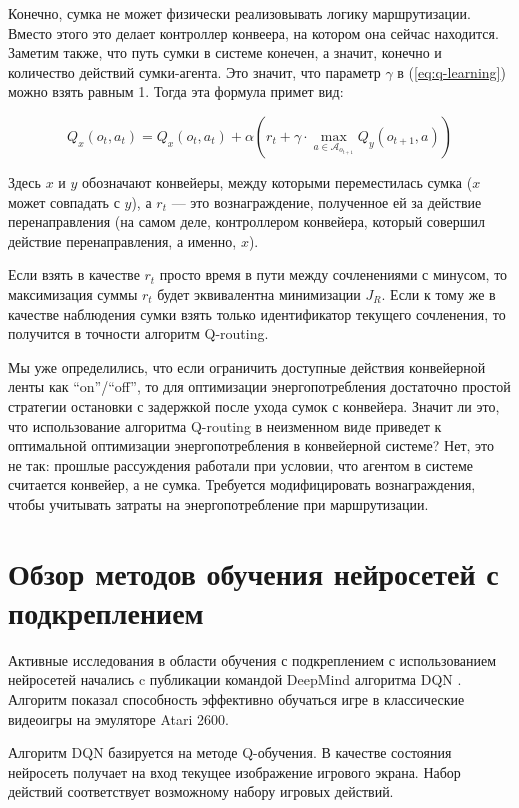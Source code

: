 \documentclass[specification,annotation,times]{itmo-student-thesis}
\theoremstyle{definition}
\begin{document}
Конечно, сумка не может физически реализовывать логику маршрутизации. Вместо
этого это делает контроллер конвеера, на котором она сейчас находится.
Заметим также, что путь сумки в системе конечен, а значит, конечно и
количество действий сумки-агента. Это значит, что параметр $\gamma$ в
(\ref{eq:q-learning}) можно взять равным 1. Тогда эта формула примет вид:

\begin{equation}
Q_x(o_t, a_t) = Q_x(o_t, a_t) + \alpha \left( r_t +
\gamma \cdot \max\limits_{a \in \mathcal{A}_{o_{t+1}}} Q_y(o_{t+1}, a) \right)
\end{equation}

Здесь $x$ и $y$ обозначают конвейеры, между которыми переместилась сумка ($x$
может совпадать с $y$),
а $r_t$ --- это вознаграждение, полученное ей за действие перенаправления (на
самом деле, контроллером конвейера, который совершил действие перенаправления, а
именно, $x$).

Если взять в качестве $r_t$ просто время в пути между сочленениями с минусом, то
максимизация суммы $r_t$ будет эквивалентна минимизации $J_R$. Если к тому же в качестве 
наблюдения сумки взять только идентификатор текущего сочленения, то получится в
точности алгоритм Q-routing.

Мы уже определились, что если ограничить доступные действия конвейерной
ленты как ``on''/``off'', то для оптимизации энергопотребления достаточно
простой стратегии остановки с задержкой после ухода сумок с конвейера.
Значит ли это, что использование алгоритма Q-routing в неизменном виде приведет
к оптимальной оптимизации энергопотребления в конвейерной системе? Нет, это не
так: прошлые рассуждения работали при условии, что агентом в системе считается
конвейер, а не сумка. Требуется модифицировать вознаграждения, чтобы учитывать
затраты на энергопотребление при маршрутизации. 

\section{Обзор методов обучения нейросетей с подкреплением}\label{overview:nns}

Активные исследования в области обучения с подкреплением с использованием
нейросетей начались c публикации командой DeepMind алгоритма
DQN \cite{deepmind-dqn-orig}. Алгоритм показал способность эффективно обучаться
игре в классические видеоигры на эмуляторе Atari 2600. 

Алгоритм DQN базируется на методе Q-обучения. В качестве состояния нейросеть
получает на вход текущее изображение игрового экрана. Набор действий
соответствует возможному набору игровых действий.
\end{document}
